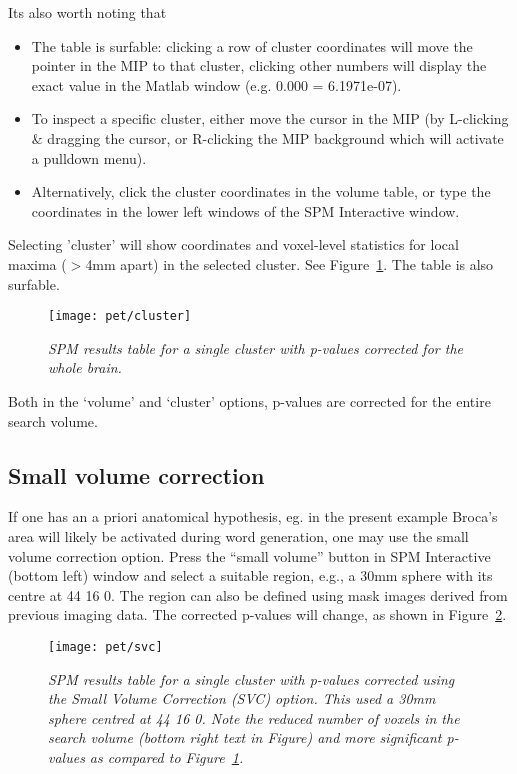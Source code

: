 Its also worth noting that
\begin{itemize}
\item{The table is surfable: clicking a row of cluster coordinates will move the pointer in the MIP to that cluster, clicking other numbers will display the exact value in the Matlab window (e.g. 0.000 = 6.1971e-07).}
\item{To inspect a specific cluster, either move the cursor in the MIP (by L-clicking \& dragging the cursor, or R-clicking the MIP background which will activate a pulldown menu).}
\item{Alternatively, click the cluster coordinates in the volume table, or type the coordinates in the lower left windows of the SPM Interactive window.}
\end{itemize}
Selecting 'cluster' will show coordinates and voxel-level statistics for local maxima ($>$4mm apart) in the selected cluster. See Figure~\ref{cluster}. The table is also surfable.
\begin{figure}
\begin{center}
\texttt{[image: pet/cluster]}
\caption{\em SPM results table for a single cluster with p-values corrected for the whole brain.  \label{cluster}}
\end{center}
\end{figure}
Both in the `volume' and `cluster' options, p-values are corrected for the entire search volume.

\subsection{Small volume correction}

If one has an a priori anatomical hypothesis, eg. in the present example Broca's area will likely be activated during word generation, one may use the small volume correction option. Press the ``small volume'' button in SPM Interactive (bottom left) window and select a suitable region, e.g., a 30mm sphere with its centre at 44 16 0.
The region can also be defined using mask images derived from previous imaging data. The corrected p-values will change,
as shown in Figure~\ref{svc}.
\begin{figure}
\begin{center}
\texttt{[image: pet/svc]}
\caption{\em SPM results table for a single cluster with p-values corrected using the Small Volume Correction (SVC) option. This used a 30mm sphere centred at 44 16 0. Note the reduced number of voxels in the search volume (bottom right text in Figure) and more significant p-values as compared to  Figure~\ref{cluster}. \label{svc}}
\end{center}
\end{figure}

